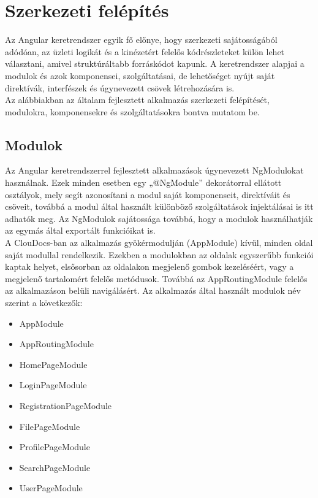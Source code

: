 \documentclass[12pt, twoside]{report}
\begin{document}
\section{Szerkezeti felépítés}
Az Angular keretrendszer egyik fő előnye, hogy szerkezeti sajátosságából adódóan, az üzleti logikát és a kinézetért felelős kódrészleteket külön lehet választani, amivel struktúráltabb forráskódot kapunk. A keretrendszer alapjai a modulok és azok komponensei, szolgáltatásai, de lehetőséget nyújt saját direktívák, interfészek és úgynevezett csövek létrehozására is.\\
Az alábbiakban az általam fejlesztett alkalmazás szerkezeti felépítését, modulokra, komponensekre és szolgáltatásokra bontva mutatom be.

\subsection{Modulok}
Az Angular keretrendszerrel fejlesztett alkalmazások úgynevezett NgModulokat használnak. Ezek minden esetben egy „@NgModule” dekorátorral ellátott osztályok, mely segít azonosítani a modul saját komponenseit, direktíváit és csöveit, továbbá a modul által használt különböző szolgáltatások injektálásai is itt adhatók meg. Az NgModulok sajátossága továbbá, hogy a modulok használhatják az egymás által exportált funkcióikat is.\\
A ClouDocs-ban az alkalmazás gyökérmodulján (AppModule) kívül, minden oldal saját modullal rendelkezik. Ezekben a modulokban az oldalak egyszerűbb funkciói kaptak helyet, elsősorban az oldalakon megjelenő gombok kezeléséért, vagy a megjelenő tartalomért felelős metódusok. Továbbá az AppRoutingModule felelős az alkalmazáson belüli navigálásért. Az alkalmazás által használt modulok név szerint a következők:
\begin{itemize}
	\item AppModule
	\item AppRoutingModule
	\item HomePageModule
	\item LoginPageModule
	\item RegistrationPageModule
	\item FilePageModule
	\item ProfilePageModule
	\item SearchPageModule
	\item UserPageModule
\end{itemize}
\end{document}
